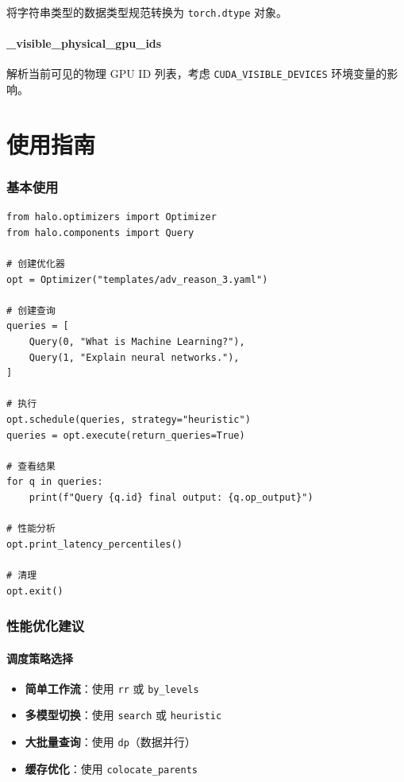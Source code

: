 \documentclass[12pt,a4paper]{article}
\begin{document}
将字符串类型的数据类型规范转换为 \texttt{torch.dtype} 对象。

\subsection{\_visible\_physical\_gpu\_ids}

解析当前可见的物理 GPU ID 列表，考虑 \texttt{CUDA\_VISIBLE\_DEVICES} 环境变量的影响。

\part{使用指南}

\section{基本使用}

\begin{lstlisting}
from halo.optimizers import Optimizer
from halo.components import Query

# 创建优化器
opt = Optimizer("templates/adv_reason_3.yaml")

# 创建查询
queries = [
    Query(0, "What is Machine Learning?"),
    Query(1, "Explain neural networks."),
]

# 执行
opt.schedule(queries, strategy="heuristic")
queries = opt.execute(return_queries=True)

# 查看结果
for q in queries:
    print(f"Query {q.id} final output: {q.op_output}")

# 性能分析
opt.print_latency_percentiles()

# 清理
opt.exit()
\end{lstlisting}

\section{性能优化建议}

\subsection{调度策略选择}

\begin{itemize}
    \item \textbf{简单工作流}：使用 \texttt{rr} 或 \texttt{by\_levels}
    \item \textbf{多模型切换}：使用 \texttt{search} 或 \texttt{heuristic}
    \item \textbf{大批量查询}：使用 \texttt{dp}（数据并行）
    \item \textbf{缓存优化}：使用 \texttt{colocate\_parents}
\end{itemize}
\end{document}
